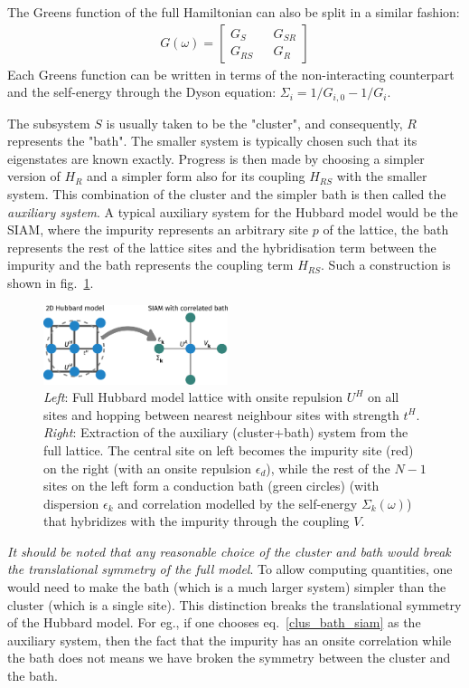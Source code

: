 \documentclass[reprint,hidelinks,onecolumn]{revtex4-2}
\begin{document}
The Greens function of the full Hamiltonian can also be split in a similar fashion:
\begin{equation}\begin{aligned}
	G(\omega) = \begin{bmatrix} G_S && G_{SR} \\ G_{RS} && G_R \end{bmatrix}
\end{aligned}\end{equation}
Each Greens function can be written in terms of the non-interacting counterpart and the self-energy through the Dyson equation: \(\Sigma_i = 1/G_{i,0} - 1/G_i\).

The subsystem \(S\) is usually taken to be the "cluster", and consequently, \(R\) represents the "bath".
The smaller system is typically chosen such that its eigenstates are known exactly.
Progress is then made by choosing a simpler version of \(H_R\) and a simpler form also for its coupling \(H_{RS}\) with the smaller system.
This combination of the cluster and the simpler bath is then called the \textit{auxiliary system}.
A typical auxiliary system for the Hubbard model would be the SIAM, where the impurity represents an arbitrary site \(p\) of the lattice, the bath represents the rest of the lattice sites and the hybridisation term between the impurity and the bath represents the coupling term \(H_{RS}\).
Such a construction is shown in fig.~\ref{cluster-bath}.
\begin{figure}[!htb]
	\centering
	\includegraphics[width=0.48\textwidth]{clusterBath.pdf}
	\caption{\textit{Left}: Full Hubbard model lattice with onsite repulsion $U^H$ on all sites and hopping between nearest neighbour sites with strength $t^H$. \textit{Right}: Extraction of the auxiliary (cluster+bath) system from the full lattice. The central site on left becomes the impurity site (red) on the right (with an onsite repulsion $\epsilon_d$), while the rest of the $N-1$ sites on the left form a conduction bath (green circles) (with dispersion $\epsilon_k$ and correlation modelled by the self-energy $\Sigma_k(\omega)$) that hybridizes with the impurity through the coupling $V$.}
	\label{cluster-bath}
\end{figure}
\textit{It should be noted that any reasonable choice of the cluster and bath would break the translational symmetry of the full model}. To allow computing quantities, one would need to make the bath (which is a much larger system) simpler than the cluster (which is a single site). This distinction breaks the translational symmetry of the Hubbard model. For eg., if one chooses eq.~\ref{clus_bath_siam} as the auxiliary system, then the fact that the impurity has an onsite correlation while the bath does not means we have broken the symmetry between the cluster and the bath.
\end{document}
